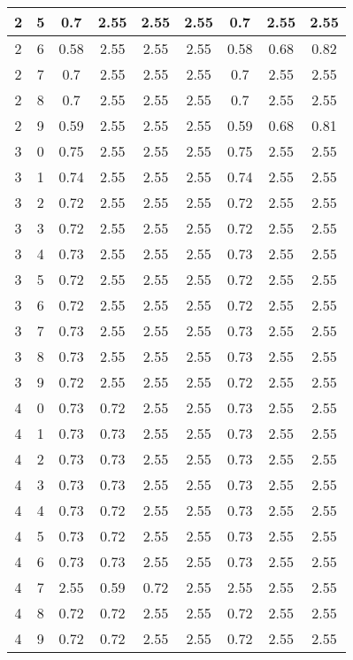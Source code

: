 \begin{longtable}{|c|c||c||c|c|c||c|c|c|}
	2 & 5 & 0.7 & 2.55 & 2.55 & 2.55 & 0.7 & 2.55 & 2.55 \\ \hline
	2 & 6 & 0.58 & 2.55 & 2.55 & 2.55 & 0.58 & 0.68 & 0.82 \\ \hline
	2 & 7 & 0.7 & 2.55 & 2.55 & 2.55 & 0.7 & 2.55 & 2.55 \\ \hline
	2 & 8 & 0.7 & 2.55 & 2.55 & 2.55 & 0.7 & 2.55 & 2.55 \\ \hline
	2 & 9 & 0.59 & 2.55 & 2.55 & 2.55 & 0.59 & 0.68 & 0.81 \\ \hline
	3 & 0 & 0.75 & 2.55 & 2.55 & 2.55 & 0.75 & 2.55 & 2.55 \\ \hline
	3 & 1 & 0.74 & 2.55 & 2.55 & 2.55 & 0.74 & 2.55 & 2.55 \\ \hline
	3 & 2 & 0.72 & 2.55 & 2.55 & 2.55 & 0.72 & 2.55 & 2.55 \\ \hline
	3 & 3 & 0.72 & 2.55 & 2.55 & 2.55 & 0.72 & 2.55 & 2.55 \\ \hline
	3 & 4 & 0.73 & 2.55 & 2.55 & 2.55 & 0.73 & 2.55 & 2.55 \\ \hline
	3 & 5 & 0.72 & 2.55 & 2.55 & 2.55 & 0.72 & 2.55 & 2.55 \\ \hline
	3 & 6 & 0.72 & 2.55 & 2.55 & 2.55 & 0.72 & 2.55 & 2.55 \\ \hline
	3 & 7 & 0.73 & 2.55 & 2.55 & 2.55 & 0.73 & 2.55 & 2.55 \\ \hline
	3 & 8 & 0.73 & 2.55 & 2.55 & 2.55 & 0.73 & 2.55 & 2.55 \\ \hline
	3 & 9 & 0.72 & 2.55 & 2.55 & 2.55 & 0.72 & 2.55 & 2.55 \\ \hline
	4 & 0 & 0.73 & 0.72 & 2.55 & 2.55 & 0.73 & 2.55 & 2.55 \\ \hline
	4 & 1 & 0.73 & 0.73 & 2.55 & 2.55 & 0.73 & 2.55 & 2.55 \\ \hline
	4 & 2 & 0.73 & 0.73 & 2.55 & 2.55 & 0.73 & 2.55 & 2.55 \\ \hline
	4 & 3 & 0.73 & 0.73 & 2.55 & 2.55 & 0.73 & 2.55 & 2.55 \\ \hline
	4 & 4 & 0.73 & 0.72 & 2.55 & 2.55 & 0.73 & 2.55 & 2.55 \\ \hline
	4 & 5 & 0.73 & 0.72 & 2.55 & 2.55 & 0.73 & 2.55 & 2.55 \\ \hline
	4 & 6 & 0.73 & 0.73 & 2.55 & 2.55 & 0.73 & 2.55 & 2.55 \\ \hline
	4 & 7 & 2.55 & 0.59 & 0.72 & 2.55 & 2.55 & 2.55 & 2.55 \\ \hline
	4 & 8 & 0.72 & 0.72 & 2.55 & 2.55 & 0.72 & 2.55 & 2.55 \\ \hline
	4 & 9 & 0.72 & 0.72 & 2.55 & 2.55 & 0.72 & 2.55 & 2.55 \\ \hline

\end{longtable}
